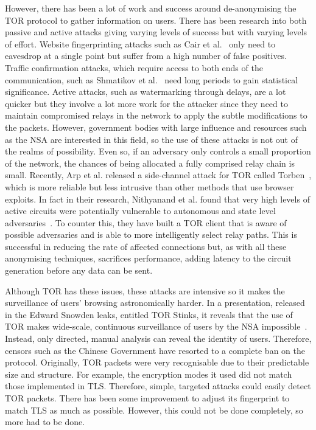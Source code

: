 \documentclass[ %
                    author={Samuel Russell},
                supervisor={Prof. Bogdan Warinschi},
                    degree={MEng},
                     title={Innocuous Ciphertexts},
                  subtitle={The DE-CENSOR Scheme},
                      type={research},
                      year={2018} ]{dissertation}
\begin{document}
However, there has been a lot of work and success around de-anonymising the TOR protocol to gather information on users. There has been research into both passive and active attacks giving varying levels of success but with varying levels of effort. Website fingerprinting attacks such as Cair et al.~\cite{webfinger} only need to eavesdrop at a single point but suffer from a high number of false positives. Traffic confirmation attacks, which require access to both ends of the communication, such as Shmatikov et al.~\cite{conf} need long periods to gain statistical significance. Active attacks, such as watermarking through delays, are a lot quicker but they involve a lot more work for the attacker since they need to maintain compromised relays in the network to apply the subtle modifications to the packets. However, government bodies with large influence and resources such as the NSA are interested in this field, so the use of these attacks is not out of the realms of possibility. Even so, if an adversary only controls a small proportion of the network, the chances of being allocated a fully comprised relay chain is small. Recently, Arp et al. released a side-channel attack for TOR called Torben~\cite{torben}, which is more reliable but less intrusive than other methods that use browser exploits. In fact in their research, Nithyanand et al. found that very high levels of active circuits were potentially vulnerable to autonomous and state level adversaries~\cite{AS}. To counter this, they have built a TOR client that is aware of possible adversaries and is able to more intelligently select relay paths. This is successful in reducing the rate of affected connections but, as with all these anonymising techniques, sacrifices performance, adding latency to the circuit generation before any data can be sent.

Although TOR has these issues, these attacks are intensive so it makes the surveillance of users' browsing astronomically harder.
In a presentation, released in the Edward Snowden leaks, entitled TOR Stinks, it reveals that the use of TOR makes wide-scale, continuous surveillance of users by the NSA impossible~\cite{tor_stinks}.
Instead, only directed, manual analysis can reveal the identity of users.
Therefore, censors such as the Chinese Government have resorted to a complete ban on the protocol.
Originally, TOR packets were very recognisable due to their predictable size and structure.
For example, the encryption modes it used did not match those implemented in TLS.
Therefore, simple, targeted attacks could easily detect TOR packets.
There has been some improvement to adjust its fingerprint to match TLS as much as possible. However, this could not be done completely, so more had to be done.
\end{document}
